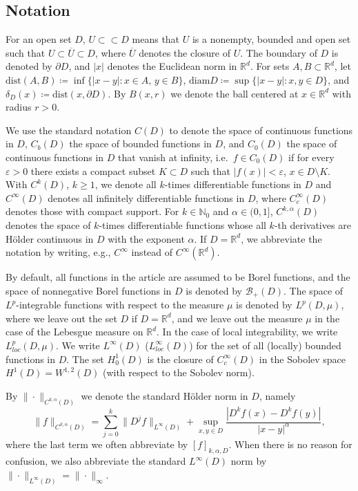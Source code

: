 \documentclass[12pt,a4paper,onecolumn]{amsart}
\theoremstyle{definition}
\newcommand{\R}{\mathbb{R}}
\newcommand{\N}{\mathbb{N}}
\newcommand{\subsub}{\subset\subset}
\newcommand{\1}{\mathbf 1}
\newcommand{\BB}{\mathcal{B}}
\newcommand{\de}{\delta_D}
\newcommand{\diam}{\textrm{diam}}
\newcommand{\dist}{\textrm{dist}}
\numberwithin{equation}{section}
\begin{document}
\subsection*{Notation}
For an open set $D$, $U\subsub D$ means that $U$ is a nonempty, bounded and open set such that $U\subset \overline U\subset D$, where $\overline U$ denotes the closure of $U$. The boundary of $D$ is denoted by $\partial D$, and $|x|$ denotes the Euclidean norm in $\R^d$. For sets $A,B\subset \R^d$, let $\dist(A,B)\coloneqq \inf\{|x-y|:x\in A,\,y\in B\}$, $\diam D\coloneqq \sup\{|x-y|:x,y\in D\}$, and $\de(x)\coloneqq \dist(x,\partial D)$. By $B(x,r)$ we denote the ball centered at $x\in \R^d$ with radius $r>0$.

We use the standard notation $C(D)$ to denote the space of continuous functions in $D$, $C_b(D)$ the space of bounded functions in $D$, and $C_0(D)$ the space of continuous functions in $D$ that vanish at infinity, i.e.~$f\in C_0(D)$ if for every $\varepsilon>0$ there exists a compact subset $K\subset D$ such that $|f(x)|<\varepsilon$, $x\in D\setminus K$. With $C^k(D)$, $k\ge 1$, we denote all $k$-times differentiable functions in $D$ and $C^\infty(D)$ denotes all infinitely differentiable functions in $D$, where $C_c^\infty(D)$ denotes those with compact support. For $k\in \N_0$ and $\alpha\in (0,1]$, $C^{k,\alpha}(D)$ denotes the space of $k$-times differentiable functions whose all $k$-th derivatives are H\"older continuous in $D$ with the exponent $\alpha$. If $D=\R^d$, we abbreviate the notation by writing, e.g., $C^\infty$ instead of $C^\infty(\R^d)$.

By default, all functions in the article are assumed to be Borel functions, and the space of nonnegative Borel functions in $D$ is denoted by $\BB_+(D)$. The space of $L^p$-integrable functions with respect to the measure $\mu$ is denoted by $L^p(D,\mu)$, where we leave out the set $D$ if $D=\R^d$, and we leave out the measure $\mu$ in the case of the Lebesgue measure on $\R^d$. In the case of local integrability, we write $L_{loc}^p(D,\mu)$. We write $L^\infty(D)$ ($L_{loc}^\infty(D)$) for the set of all (locally) bounded functions in $D$. The set $H_0^1(D)$ is the closure of $C_c^\infty(D)$ in the Sobolev space $H^1(D)=W^{1,2}(D)$ (with respect to the Sobolev norm).

By $\|\cdot\|_{C^{k,\alpha}(D)}$ we denote the standard H\"older norm in $D$, namely
$$\|f\|_{C^{k,\alpha}(D)}=\sum_{j=0}^k \| D^j f\|_{L^\infty(D)}+\sup_{x,y\in D}\frac{|D^kf(x)-D^kf(y)|}{|x-y|^{\alpha}},$$
where the last term we often abbreviate by $[f]_{k,\alpha,D}$.
When there is no reason for confusion, we also abbreviate the standard $L^\infty(D)$ norm by $\|\cdot\|_{L^\infty(D)}=\|\cdot\|_\infty$.
\end{document}
